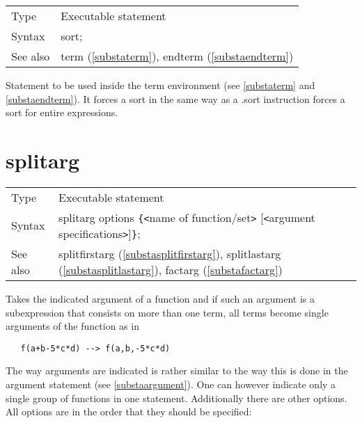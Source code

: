 \noindent \begin{tabular}{ll}
Type & Executable statement\\
Syntax & sort;
\\ See also & term (\ref{substaterm}), endterm (\ref{substaendterm})
\end{tabular} \vspace{4mm}

\noindent Statement to be used inside the term 
environment (see \ref{substaterm} and 
\ref{substaendterm}). It forces a sort in the same way as a 
.sort instruction forces a sort for entire expressions. 
\vspace{10mm}


\section{splitarg}
\label{substasplitarg}

\noindent \begin{tabular}{ll}
Type & Executable statement\\
Syntax & splitarg options \verb:{:{\tt<}name of function/set{\tt>}
             [{\tt<}argument specifications{\tt>}]\verb:}:;
\\ See also & splitfirstarg (\ref{substasplitfirstarg}),
             splitlastarg (\ref{substasplitlastarg}),
             factarg (\ref{substafactarg})
\end{tabular}\vspace{4mm}

\noindent Takes the indicated argument of a 
function and if such an argument is a subexpression that consists on more 
than one term, all terms become single arguments of the function as in
\begin{verbatim}
   f(a+b-5*c*d) --> f(a,b,-5*c*d)
\end{verbatim}
The way arguments are indicated is rather similar to the way this is done 
in the argument statement (see 
\ref{substaargument}). One can however indicate only a single group of 
functions in one statement. Additionally there are other options. All 
options are in the order that they should be specified:


